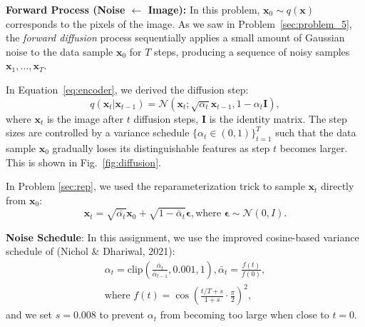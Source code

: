 \documentclass[11pt,addpoints,answers]{exam}
\newcommand{\xv}{\mathbf{x}}
\newcommand{\epsilonv   }{\boldsymbol \epsilon   }
\begin{document}
\begin{questions}
    \textbf{Forward Process (Noise $\leftarrow$ Image):} 
    In this problem, $\xv_0 \sim q(\xv)$ corresponds to the pixels of the image. As we saw in Problem~\ref{sec:problem_5}, the \textit{forward diffusion} process  sequentially applies a small amount of Gaussian noise to the data sample $\xv_0$ for \( T \) steps, producing a sequence of noisy samples \( \xv_1, \ldots, \xv_T \).

    In Equation~\ref{eq:encoder}, we derived the diffusion step:
    \begin{equation}
        q(\xv_t | \xv_{t-1}) = \mathcal{N}(\xv_t; \sqrt{\alpha_t}\xv_{t-1}, 1-\alpha_t \boldsymbol{I}),
    \end{equation}
    where $\xv_t$ is the image after $t$ diffusion steps, $\boldsymbol{I}$ is the identity matrix.
    The step sizes are controlled by a variance schedule \( \{\alpha_t \in (0,1)\}_{t=1}^T \) such that the data sample \( \xv_0 \) gradually loses its distinguishable features as step \( t \) becomes larger. This is shown in Fig.~\ref{fig:diffusion}.

    \par

    In Problem \ref{sec:rep}, we used the reparameterization trick to sample \( \xv_t \) directly from \(\xv_0 \):
    \begin{equation}
        \xv_t = \sqrt{\bar{\alpha_t}}\xv_0 + \sqrt{1 - \bar\alpha_t} \epsilonv, \text{where } \epsilonv \sim \mathcal{N}(0,I).
        \label{eq:xt}
    \end{equation}

    \textbf{Noise Schedule}: In this assignment, we use the improved cosine-based variance schedule of (Nichol \& Dhariwal, 2021):
    \begin{equation}
        \begin{aligned}
            \alpha_t = \text{clip}\left(\frac{\bar{\alpha}_t}{\bar\alpha_{t-1}}, 0.001, 1\right), \bar{\alpha}_t = \frac{f(t)}{f(0)}, \\
            \text{where } f(t) = \cos\left(\frac{t/T + s}{1 + s} \cdot \frac{\pi}{2}\right)^2,
        \end{aligned}
    \end{equation}
    and we set $s=0.008$ to prevent $\alpha_t$ from becoming too large when close to $t = 0$.
    

\end{questions}
\end{document}
